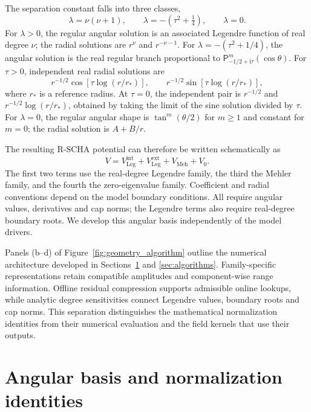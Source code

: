 ﻿\documentclass[11pt,a4paper]{article}
\newcommand{\ii}{\mathrm{i}}
\newcommand{\RSCHA}{\textsc{R-SCHA}\xspace}
\begin{document}
The separation constant falls into three classes,
\begin{equation}
 \lambda=\nu(\nu+1),\qquad
 \lambda=-\left(\tau^2+\tfrac14\right),\qquad
 \lambda=0.
 \label{eq:three_spectra}
\end{equation}
For $\lambda>0$, the regular angular solution is an associated Legendre function of real degree $\nu$; the radial solutions are $r^\nu$ and $r^{-\nu-1}$. For $\lambda=-(\tau^2+1/4)$, the angular solution is the real regular branch proportional to $\mathsf P_{-1/2+\ii\tau}^{m}(\cos\theta)$. For $\tau>0$, independent real radial solutions are
\begin{equation}
 r^{-1/2}\cos\!\left[\tau\log(r/r_*)\right],\qquad
 r^{-1/2}\sin\!\left[\tau\log(r/r_*)\right],
 \label{eq:mehler_radial_pair}
\end{equation}
where $r_*$ is a reference radius. At $\tau=0$, the independent pair is $r^{-1/2}$ and $r^{-1/2}\log(r/r_*)$, obtained by taking the limit of the sine solution divided by $\tau$. For $\lambda=0$, the regular angular shape is $\tan^m(\theta/2)$ for $m\geq1$ and constant for $m=0$; the radial solution is $A+B/r$.

The resulting \RSCHA potential can therefore be written schematically as
\begin{equation}
 V=V_{\mathrm{Leg}}^{\mathrm{int}}+V_{\mathrm{Leg}}^{\mathrm{ext}}
  +V_{\mathrm{Meh}}+V_{0}.
 \label{eq:rscha_four_parts}
\end{equation}
The first two terms use the real-degree Legendre family, the third the Mehler family, and the fourth the zero-eigenvalue family. Coefficient and radial conventions depend on the model boundary conditions. All require angular values, derivatives and cap norms; the Legendre terms also require real-degree boundary roots. We develop this angular basis independently of the model drivers.

Panels (b--d) of Figure~\ref{fig:geometry_algorithm} outline the numerical architecture developed in Sections~\ref{sec:angular_basis} and \ref{sec:algorithms}. Family-specific representations retain compatible amplitudes and component-wise range information. Offline residual compression supports admissible online lookups, while analytic degree sensitivities connect Legendre values, boundary roots and cap norms. This separation distinguishes the mathematical normalization identities from their numerical evaluation and the field kernels that use their outputs.

\section{Angular basis and normalization identities}
\label{sec:angular_basis}
\end{document}
